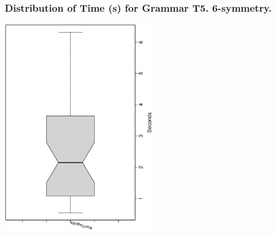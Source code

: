  \begin{frame}
 \frametitle{ Distribution of Time (s) for Grammar T5. 6-symmetry. }
 \begin{center}
\includegraphics[width=0.5\textwidth, angle=-90]
{ExpFboxplottSeconds004.eps}
 \end{center}
 \label{ExpFboxplottSeconds004.eps}  
 \end{frame}

